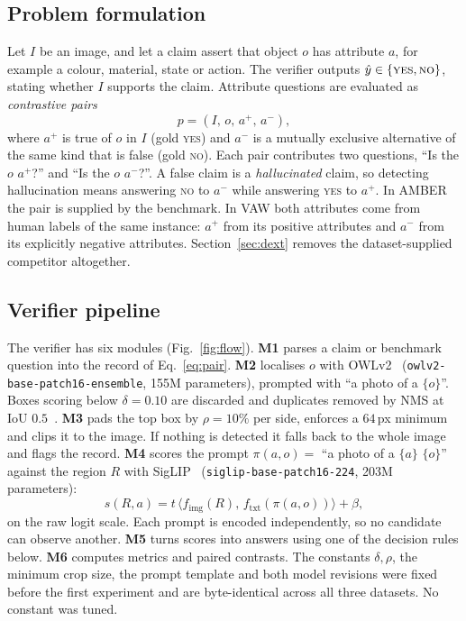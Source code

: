 \documentclass[11pt]{article}
\newcommand{\yes}{\textsc{yes}}
\newcommand{\no}{\textsc{no}}
\begin{document}
\subsection{Problem formulation}
Let $I$ be an image, and let a claim assert that object $o$ has attribute $a$, for example a colour, material, state or action. The verifier outputs $\hat y\in\{\yes,\no\}$, stating whether $I$ supports the claim. Attribute questions are evaluated as \emph{contrastive pairs}
\begin{equation}
p=(I,\,o,\,a^{+},\,a^{-}),
\label{eq:pair}
\end{equation}
where $a^{+}$ is true of $o$ in $I$ (gold \yes) and $a^{-}$ is a mutually exclusive alternative of the same kind that is false (gold \no). Each pair contributes two questions, ``Is the $o$ $a^{+}$?'' and ``Is the $o$ $a^{-}$?''. A false claim is a \emph{hallucinated} claim, so detecting hallucination means answering \no{} to $a^{-}$ while answering \yes{} to $a^{+}$. In AMBER the pair is supplied by the benchmark. In VAW both attributes come from human labels of the same instance: $a^{+}$ from its positive attributes and $a^{-}$ from its explicitly negative attributes. Section~\ref{sec:dext} removes the dataset-supplied competitor altogether.

\subsection{Verifier pipeline}
The verifier has six modules (Fig.~\ref{fig:flow}). \textbf{M1} parses a claim or benchmark question into the record of Eq.~\eqref{eq:pair}. \textbf{M2} localises $o$ with OWLv2~\cite{minderer2023owlv2} (\texttt{owlv2-base-patch16-ensemble}, 155M parameters), prompted with ``a photo of a $\{o\}$''. Boxes scoring below $\delta=0.10$ are discarded and duplicates removed by NMS at IoU $0.5$~\cite{neubeck2006nms}. \textbf{M3} pads the top box by $\rho=10\%$ per side, enforces a $64$\,px minimum and clips it to the image. If nothing is detected it falls back to the whole image and flags the record. \textbf{M4} scores the prompt $\pi(a,o)=$ ``a photo of a $\{a\}$ $\{o\}$'' against the region $R$ with SigLIP~\cite{zhai2023siglip} (\texttt{siglip-base-patch16-224}, 203M parameters):
\begin{equation}
s(R,a)=t\,\langle f_{\mathrm{img}}(R),\,f_{\mathrm{txt}}(\pi(a,o))\rangle+\beta,
\label{eq:siglip}
\end{equation}
on the raw logit scale. Each prompt is encoded independently, so no candidate can observe another. \textbf{M5} turns scores into answers using one of the decision rules below. \textbf{M6} computes metrics and paired contrasts. The constants $\delta,\rho$, the minimum crop size, the prompt template and both model revisions were fixed before the first experiment and are byte-identical across all three datasets. No constant was tuned.
\end{document}
